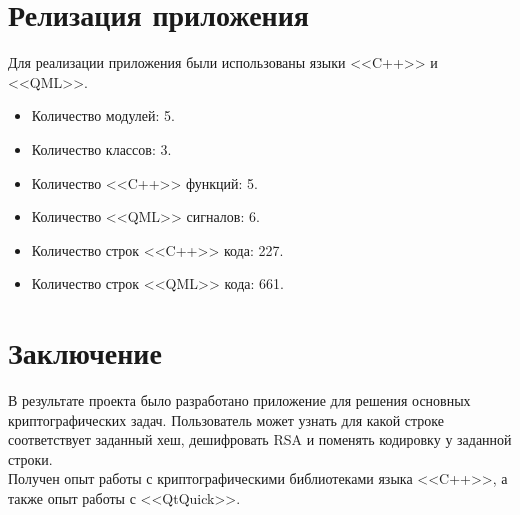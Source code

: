 \documentclass[a4paper,12pt]{article}
\begin{document}

\newpage

\section{Релизация приложения}
Для реализации приложения были использованы языки <<C++>> и <<QML>>. 
\begin{itemize}
    \item Количество модулей: 5.
    \item Количество классов: 3.
    \item Количество <<C++>> функций: 5.
    \item Количество <<QML>> сигналов: 6.
    \item Количество строк <<C++>> кода: 227.
    \item Количество строк <<QML>> кода: 661.
\end{itemize}


\newpage


\section*{Заключение}

В результате проекта было разработано приложение для решения основных криптографических задач. Пользователь может узнать для какой строке соответствует заданный хеш, дешифровать RSA и поменять кодировку у заданной строки.\\

Получен опыт работы с криптографическими библиотеками языка <<C++>>, а также опыт работы с <<QtQuick>>.
\end{document}
